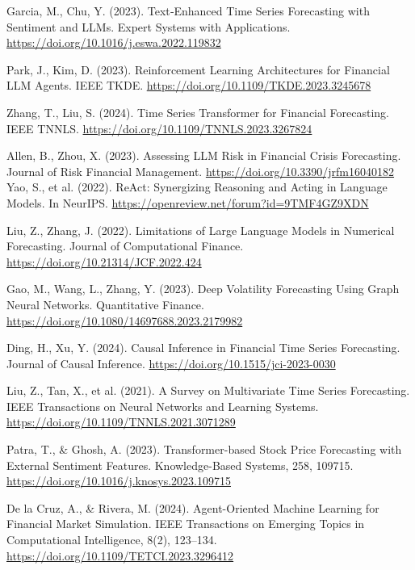 \documentclass[conference]{IEEEtran}
\begin{document}
\begin{thebibliography}{99}
 Garcia, M., Chu, Y. (2023). Text‑Enhanced Time Series Forecasting with Sentiment and LLMs. Expert Systems with Applications. \url{https://doi.org/10.1016/j.eswa.2022.119832}

 Park, J., Kim, D. (2023). Reinforcement Learning Architectures for Financial LLM Agents. IEEE TKDE. \url{https://doi.org/10.1109/TKDE.2023.3245678}

 Zhang, T., Liu, S. (2024). Time Series Transformer for Financial Forecasting. IEEE TNNLS. \url{https://doi.org/10.1109/TNNLS.2023.3267824}

 Allen, B., Zhou, X. (2023). Assessing LLM Risk in Financial Crisis Forecasting. Journal of Risk Financial Management. \url{https://doi.org/10.3390/jrfm16040182}
 Yao, S., et al. (2022). ReAct: Synergizing Reasoning and Acting in Language Models. In NeurIPS. \url{https://openreview.net/forum?id=9TMF4GZ9XDN}

 Liu, Z., Zhang, J. (2022). Limitations of Large Language Models in Numerical Forecasting. Journal of Computational Finance. \url{https://doi.org/10.21314/JCF.2022.424}

 Gao, M., Wang, L., Zhang, Y. (2023). Deep Volatility Forecasting Using Graph Neural Networks. Quantitative Finance. \url{https://doi.org/10.1080/14697688.2023.2179982}

 Ding, H., Xu, Y. (2024). Causal Inference in Financial Time Series Forecasting. Journal of Causal Inference. \url{https://doi.org/10.1515/jci-2023-0030}

 Liu, Z., Tan, X., et al. (2021). A Survey on Multivariate Time Series Forecasting. IEEE Transactions on Neural Networks and Learning Systems. \url{https://doi.org/10.1109/TNNLS.2021.3071289}





 Patra, T., & Ghosh, A. (2023). Transformer-based Stock Price Forecasting with External Sentiment Features. Knowledge-Based Systems, 258, 109715. \url{https://doi.org/10.1016/j.knosys.2023.109715}

 De la Cruz, A., & Rivera, M. (2024). Agent-Oriented Machine Learning for Financial Market Simulation. IEEE Transactions on Emerging Topics in Computational Intelligence, 8(2), 123–134. \url{https://doi.org/10.1109/TETCI.2023.3296412}


\end{thebibliography}
\end{document}
